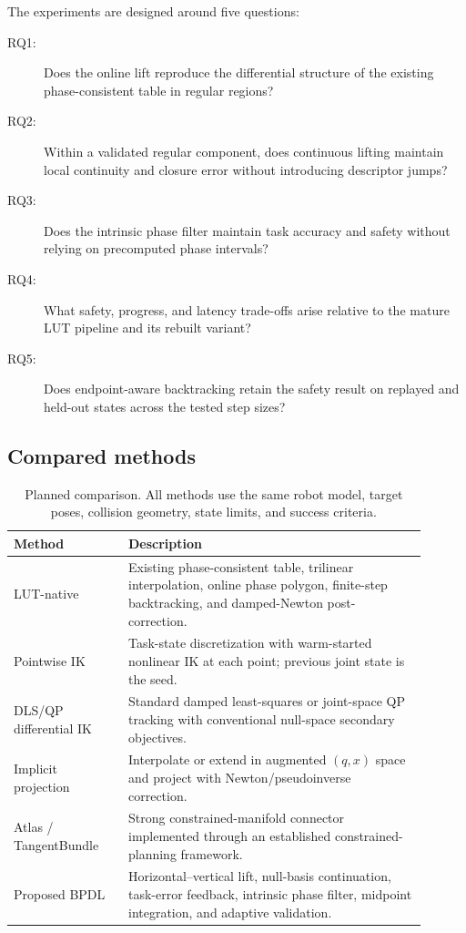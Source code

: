 \documentclass[preprint,12pt]{elsarticle}
\newcommand{\method}{BPDL}
\begin{document}
The experiments are designed around five questions:
\begin{description}
    \item[RQ1:] Does the online lift reproduce the differential structure of the existing phase-consistent table in regular regions?
    \item[RQ2:] Within a validated regular component, does continuous lifting maintain local continuity and closure error without introducing descriptor jumps?
    \item[RQ3:] Does the intrinsic phase filter maintain task accuracy and safety without relying on precomputed phase intervals?
    \item[RQ4:] What safety, progress, and latency trade-offs arise relative to the mature LUT pipeline and its rebuilt variant?
    \item[RQ5:] Does endpoint-aware backtracking retain the safety result on replayed and held-out states across the tested step sizes?
\end{description}

\subsection{Compared methods}

\begin{table}[t]
\centering
\caption{Planned comparison. All methods use the same robot model, target poses, collision geometry, state limits, and success criteria.}
\label{tab:baselines}
\begin{tabular}{>{\raggedright\arraybackslash}p{0.25\linewidth}>{\raggedright\arraybackslash}p{0.65\linewidth}}
\toprule
Method & Description \\
\midrule
LUT-native & Existing phase-consistent table, trilinear interpolation, online phase polygon, finite-step backtracking, and damped-Newton post-correction. \\
Pointwise IK & Task-state discretization with warm-started nonlinear IK at each point; previous joint state is the seed. \\
DLS/QP differential IK & Standard damped least-squares or joint-space QP tracking with conventional null-space secondary objectives. \\
Implicit projection & Interpolate or extend in augmented $(q,x)$ space and project with Newton/pseudoinverse correction. \\
Atlas / TangentBundle & Strong constrained-manifold connector implemented through an established constrained-planning framework. \\
Proposed \method & Horizontal--vertical lift, null-basis continuation, task-error feedback, intrinsic phase filter, midpoint integration, and adaptive validation. \\
\bottomrule
\end{tabular}
\end{table}
\end{document}
